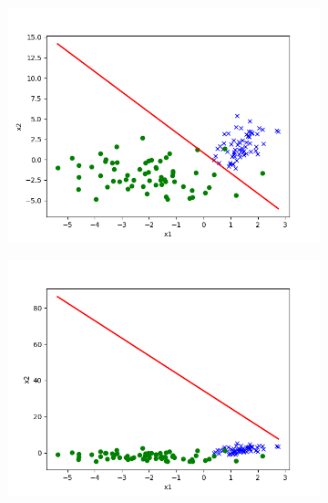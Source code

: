 \begin{answer}
    \begin{figure}[htbp]
        \begin{subfigure}[b]{0.5\linewidth}
            \centering
            \includegraphics[width=\linewidth]{../src/output/p02c_pred.png}
        \end{subfigure}
        \begin{subfigure}[b]{0.5\linewidth}
            \centering
            \includegraphics[width=\linewidth]{../src/output/p02d_pred.png}
        \end{subfigure}
        \begin{subfigure}[b]{0.5\linewidth}

\end{subfigure}
\end{figure}
\end{answer}
